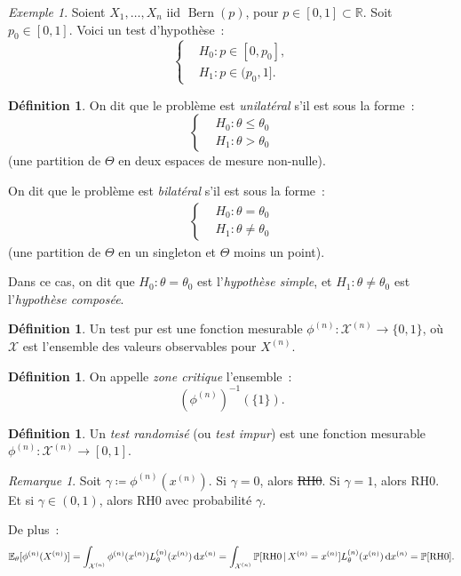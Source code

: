 \documentclass{report}
\DeclareMathOperator{\Bern}{Bern}  %
\renewcommand{\P}{\mathbb P}
\newcommand{\E}{\mathbb E}
\newcommand{\R}{\mathbb R}
\newcommand{\n}{{(n)}}
\theoremstyle{definition}
\newtheorem{déf}[thm]{Définition}
\theoremstyle{remark}
\newtheorem*{rmq}{Remarque}
\newtheorem{ex}{Exemple}[chapter]
\begin{document}
	\begin{ex} Soient $X_1, \ldots, X_n$ iid $\Bern(p)$, pour $p \in [0, 1] \subset \R$. Soit $p_0 \in [0, 1]$. Voici un test d'hypothèse~:
	\[\begin{cases}
		&H_0 : p \in [0, p_0], \\
		&H_1 : p \in (p_0, 1].
	\end{cases}\]
	\end{ex}

	\begin{déf} On dit que le problème est \textit{unilatéral} s'il est sous la forme~:
	\[\begin{cases}
		&H_0 : \theta \leq \theta_0 \\
		&H_1 : \theta > \theta_0
	\end{cases}\]
	(une partition de $\Theta$ en deux espaces de mesure non-nulle).

	On dit que le problème est \textit{bilatéral} s'il est sous la forme~:
	\begin{align}\label{eq:test_hyp_=_neq}
		\begin{cases}
			&H_0 : \theta = \theta_0 \\
			&H_1 : \theta \neq \theta_0
		\end{cases}
	\end{align}
	(une partition de $\Theta$ en un singleton et $\Theta$ moins un point).

	Dans ce cas, on dit que $H_0 : \theta = \theta_0$ est l'\textit{hypothèse simple}, et $H_1 : \theta \neq \theta_0$ est l'\textit{hypothèse composée}.
	\end{déf}

	\begin{déf} Un test pur est une fonction mesurable $\phi^\n : \mathcal X^\n \to \{0, 1\}$, où $\mathcal X$ est l'ensemble des valeurs observables pour $X^\n$.
	\end{déf}

	\begin{déf} On appelle \textit{zone critique} l'ensemble~:
	\[\left(\phi^\n\right)^{-1}\left(\{1\}\right).\]
	\end{déf}

	\begin{déf} Un \textit{test randomisé} (ou \textit{test impur}) est une fonction mesurable $\phi^\n : \mathcal X^\n \to [0, 1]$.
	\end{déf}

	\begin{rmq} Soit $\gamma \coloneqq \phi^\n(x^\n)$. Si $\gamma = 0$, alors \sout {RH0}. Si $\gamma = 1$, alors RH0. Et si $\gamma \in (0, 1)$, alors
	RH0 avec probabilité $\gamma$.

	De plus~:
	\[\E_\theta[\phi^\n(X^\n)] = \int_{\mathcal X^\n}\phi^\n(x^\n)L_\theta^\n(x^\n)\dif x^\n
		= \int_{\mathcal X^\n}\P[\text{RH0} \, | \, X^\n = x^\n]L_\theta^\n(x^\n)\dif x^\n
		= \P[\text{RH0}].\]
	\end{rmq}
\end{document}
